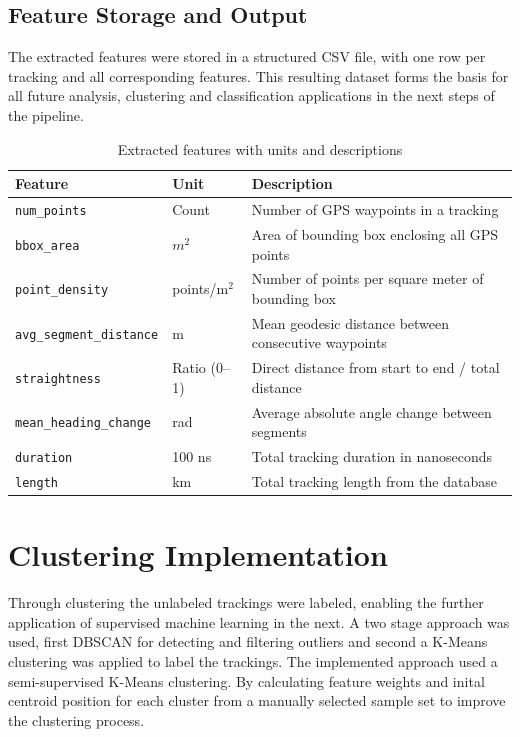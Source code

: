 \documentclass[a4paper,12pt,twoside]{scrreprt}
\begin{document}
\subsection{Feature Storage and Output}

The extracted features were stored in a structured CSV file, with one row per
tracking and all corresponding features. This resulting dataset forms the
basis for all future analysis, clustering and classification applications in
the next steps of the pipeline.

\begin{table}[ht]
  \centering
  \begin{tabular}{|l|l|l|}
    \hline
    \textbf{Feature}                & \textbf{Unit} & \textbf{Description}
    \\
    \hline
    \texttt{num\_points}            & Count         & Number of GPS waypoints
    in a tracking
    \\
    \texttt{bbox\_area}             & $m^2$         & Area of bounding box
    enclosing all GPS points
    \\
    \texttt{point\_density}         & points/m$^2$  & Number of points per
    square meter
    of bounding box
    \\
    \texttt{avg\_segment\_distance} & m             & Mean geodesic distance
    between
    consecutive waypoints
    \\
    \texttt{straightness}           & Ratio (0–1)   & Direct distance from
    start to end /
    total distance
    \\
    \texttt{mean\_heading\_change}  & rad           & Average absolute angle
    change
    between segments
    \\
    \texttt{duration}               & 100 ns        & Total tracking
    duration in nanoseconds
    \\
    \texttt{length}                 & km            & Total tracking length
    from the database
    \\
    \hline
  \end{tabular}
  \caption{Extracted features with units and descriptions}
  \label{tab:feature_units}
\end{table}

\section{Clustering Implementation}
Through clustering the unlabeled trackings were labeled, enabling the further
application of supervised machine learning in the next.
A two stage approach was used, first DBSCAN for detecting and filtering
outliers and second a K-Means clustering was applied to label the trackings.
The implemented approach used a semi-supervised K-Means clustering. By
calculating feature weights and inital centroid position for each cluster from
a manually selected sample set to improve the clustering process.
\end{document}
